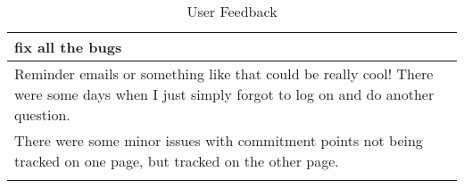 \begin{longtable}{|p{1\linewidth}|}
		\hline
		fix all the bugs                                                                                                                                                                                                                                                                                                                                                                                                                                                                                                                                                                                                                                                                                 \\
		\hline
		Reminder emails or something like that could be really cool! There were some days when I just simply forgot to log on and do another question.                                                                                                                                                                                                                                                                                                                                                                                                                                                                                                                                                   \\
		\hline
		There were some minor issues with commitment points not being tracked on one page, but tracked on the other page. 
		\\
		\hline                                                                                                                                                                                                                                                                                                                                                                                                                                             
		\caption{User Feedback} %
		\label{tab:myfirstlongtable}          
\end{longtable}